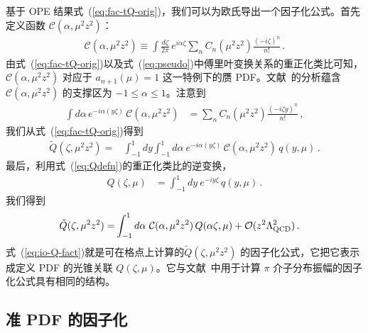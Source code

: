 基于 OPE 结果式~(\ref{eq:fac-tQ-orig})，我们可以为欧氏\spcorr 导出一个因子化公式。首先定义函数 $\mathcal{C} (\alpha, {\mu}^2 z^2)$：
\begin{align}  \label{eq:fac-C}
\mathcal{C} (\alpha, {\mu}^2 z^2) \equiv \int\! \frac{d \zeta}{2 \pi} \,
 e^{i \alpha \zeta}  \sum_n C_n ({\mu}^2 z^2)  \frac{(-i \zeta)^n}{n!}
 \,.
\end{align}
由式~(\ref{eq:fac-tQ-orig})以及式~(\ref{eq:pseudo})中傅里叶变换关系的重正化类比可知，$\mathcal{C}(\alpha,\mu^2z^2)$ 对应于 $a_{n+1}(\mu)=1$ 这一特例下的赝 PDF。文献~\cite{Radyushkin:1983wh,Radyushkin:2016hsy}的分析蕴含 $\mathcal{C}(\alpha,\mu^2z^2)$ 的支撑区为 $-1 \le \alpha \le 1$。注意到
\begin{align}
  \int d\alpha\, e^{-i\alpha(y \zeta)}\, \mathcal{C} (\alpha, {\mu}^2 z^2)
   &= \sum_n C_n(\mu^2 z^2) \frac{(-i\zeta y)^n}{n!} \,,
\end{align}
我们从式~(\ref{eq:fac-tQ-orig})得到
\begin{align}
\tilde{Q}(\zeta,\mu^2 z^2)
= &\int_{-1}^1\!\! dy\int_{-1}^1\!\! d\alpha\ e^{-i\alpha(y\zeta)}\, \mathcal{C}(\alpha,\mu^2z^2)\, q(y,\mu) \,.
\end{align}
最后，利用式~(\ref{eq:Qdefn})的重正化类比的逆变换，
\begin{align} \label{eq:FTq}
Q(\zeta,\mu) &= \int_{-1}^1\!\! dy\: e^{-i y\zeta}\,
  q(y,\mu) \,.
\end{align}
我们得到
\begin{align} \label{eq:io-Q-fact}
\tilde{Q}(\zeta,\mu^2 z^2)
=& \int_{-1}^1 d\alpha\ \mathcal{C}(\alpha,\mu^2z^2)\, Q(\alpha \zeta,\mu)
 + {\cal O}(z^2\Lambda_{\rm QCD}^2)
\,.
\end{align}
式~(\ref{eq:io-Q-fact})就是可在格点上计算的\spcorr $\tilde Q(\zeta,\mu^2 z^2)$ 的因子化公式，它把它表示成定义 PDF 的光锥关联 $Q(\zeta,\mu)$。它与文献~\cite{Braun:2007wv,Bali:2017gfr}中用于计算 $\pi$ 介子分布振幅的\spcorr 因子化公式具有相同的结构。

\subsection{准 PDF 的因子化}

